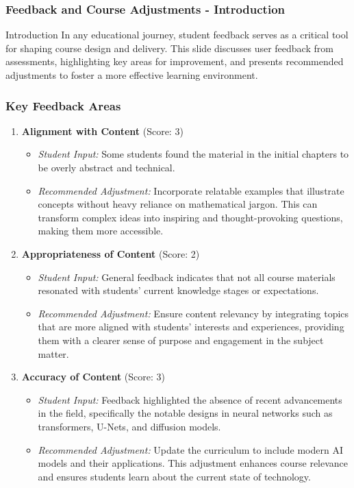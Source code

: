 \documentclass[aspectratio=169]{beamer}
\begin{document}
\begin{frame}[fragile]
    \frametitle{Feedback and Course Adjustments - Introduction}
    \begin{block}{Introduction}
        In any educational journey, student feedback serves as a critical tool for shaping course design and delivery. This slide discusses user feedback from assessments, highlighting key areas for improvement, and presents recommended adjustments to foster a more effective learning environment.
    \end{block}
\end{frame}

\begin{frame}[fragile]
    \frametitle{Key Feedback Areas}
    \begin{enumerate}
        \item \textbf{Alignment with Content} (Score: 3)
            \begin{itemize}
                \item \textit{Student Input:} Some students found the material in the initial chapters to be overly abstract and technical.
                \item \textit{Recommended Adjustment:} Incorporate relatable examples that illustrate concepts without heavy reliance on mathematical jargon. This can transform complex ideas into inspiring and thought-provoking questions, making them more accessible.
            \end{itemize}
            
        \item \textbf{Appropriateness of Content} (Score: 2)
            \begin{itemize}
                \item \textit{Student Input:} General feedback indicates that not all course materials resonated with students' current knowledge stages or expectations.
                \item \textit{Recommended Adjustment:} Ensure content relevancy by integrating topics that are more aligned with students’ interests and experiences, providing them with a clearer sense of purpose and engagement in the subject matter.
            \end{itemize}
            
        \item \textbf{Accuracy of Content} (Score: 3)
            \begin{itemize}
                \item \textit{Student Input:} Feedback highlighted the absence of recent advancements in the field, specifically the notable designs in neural networks such as transformers, U-Nets, and diffusion models.
                \item \textit{Recommended Adjustment:} Update the curriculum to include modern AI models and their applications. This adjustment enhances course relevance and ensures students learn about the current state of technology.
            \end{itemize}
    \end{enumerate}
\end{frame}
\end{document}
